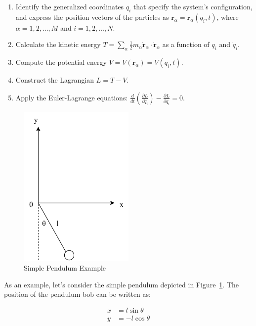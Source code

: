 \begin{enumerate}
    \item Identify the generalized coordinates $q_i$ that specify the system's 
    configuration, and express the position vectors of the particles as 
    $\mathbf{r}_\alpha=\mathbf{r}_\alpha(q_i, t)$, where $\alpha = 1, 2, \dots, M$ and 
    $i = 1, 2, \dots, N$.
    \item Calculate the kinetic energy 
    $T = \sum_\alpha \frac{1}{2} m_\alpha \dot{\mathbf{r}}_\alpha \cdot \dot{\mathbf{r}}_\alpha$ 
    as a function of $q_i$ and $\dot{q}_i$.
    \item Compute the potential energy $V = V(\mathbf{r}_\alpha) = V(q_i, t)$.
    \item Construct the Lagrangian $L = T - V$.
    \item Apply the Euler-Lagrange equations: 
    $\frac{d}{dt} \left(\frac{\partial L}{\partial \dot{q}_i}\right) - \frac{\partial L}{\partial q_i} = 0$.
\end{enumerate}

\begin{figure}[ht]
    \centering
    \includegraphics[width=0.5\textwidth]{images/2-1-1.png}
    \caption{Simple Pendulum Example}
    \label{fig:2-1-1}
\end{figure}

As an example, let's consider the simple pendulum depicted in Figure~\ref{fig:2-1-1}. 
The position of the pendulum bob can be written as:

\begin{align*}
    x &= l \sin{\theta} \\
    y &= -l \cos{\theta} \\
\end{align*}

